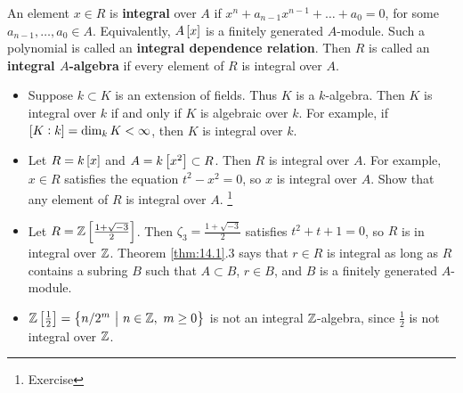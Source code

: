 
\begin{definition}
An element $ x \in R $ is \textbf{integral} over $ A $ if $ x^n + a_{n - 1}x^{n - 1} + \dots + a_0 = 0 $, for some $ a_{n - 1}, \dots, a_0 \in A $. Equivalently, $ A\sbr{x} $ is a finitely generated $ A $-module. Such a polynomial is called an \textbf{integral dependence relation}. Then $ R $ is called an \textbf{integral $ A $-algebra} if every element of $ R $ is integral over $ A $.
\end{definition}

\begin{example*}
\hfill
\begin{itemize}
\item Suppose $ k \subset K $ is an extension of fields. Thus $ K $ is a $ k $-algebra. Then $ K $ is integral over $ k $ if and only if $ K $ is algebraic over $ k $. For example, if $ \sbr{K : k} = \dim_k K < \infty $, then $ K $ is integral over $ k $.
\item Let $ R = k\sbr{x} $ and $ A = k\sbr{x^2} \subset R $. Then $ R $ is integral over $ A $. For example, $ x \in R $ satisfies the equation $ t^2 - x^2 = 0 $, so $ x $ is integral over $ A $. Show that any element of $ R $ is integral over $ A $. \footnote{Exercise}
\item Let $ R = \ZZ\sbr{\tfrac{1 + \sqrt{-3}}{2}} $. Then $ \zeta_3 = \tfrac{1 + \sqrt{-3}}{2} $ satisfies $ t^2 + t + 1 = 0 $, so $ R $ is in integral over $ \mathbb{Z} $. Theorem \ref{thm:14.1}.$ 3 $ says that $ r \in R $ is integral as long as $ R $ contains a subring $ B $ such that $ A \subset B $, $ r \in B $, and $ B $ is a finitely generated $ A $-module.
\item $ \ZZ\sbr{\tfrac{1}{2}} = \cbr{n / 2^m \st n \in \ZZ, \ m \ge 0} $ is not an integral $ \mathbb{Z} $-algebra, since $ \tfrac{1}{2} $ is not integral over $ \mathbb{Z} $.
\end{itemize}
\end{example*}

